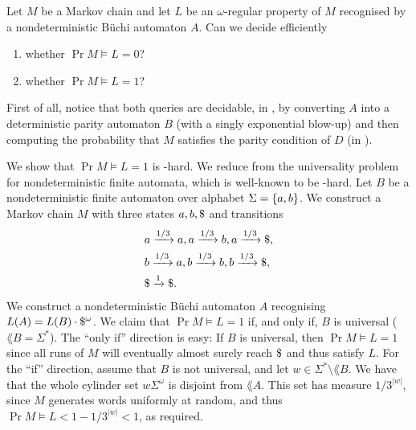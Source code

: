 \begin{exercise}
    Let $M$ be a Markov chain
    and let $L$ be an $\omega$-regular property of $M$ recognised by a nondeterministic Büchi automaton $A$.
    Can we decide efficiently
    \begin{enumerate}
        \item whether $\Pr {M \models L} = 0$?
        \item whether $\Pr {M \models L} = 1$?
    \end{enumerate} 
\end{exercise}
\begin{solution}
    First of all, notice that both queries are decidable, in \PSPACE,
    by converting $A$ into a deterministic parity automaton $B$ (with a singly exponential blow-up)
    and then computing the probability that $M$ satisfies the parity condition of $D$ (in ).

    We show that $\Pr {M \models L} = 1$ is \PSPACE-hard.
    We reduce from the universality problem for nondeterministic finite automata, which is well-known to be \PSPACE-hard.
    Let $B$ be a nondeterministic finite automaton over alphabet $\Sigma = \left\{a, b\right\}$.
    We construct a Markov chain $M$ with three states $a, b, \dollar$ and transitions
    \begin{align*}
        &a \xrightarrow{1/3} a, a \xrightarrow{1/3} b, a \xrightarrow{1/3} \$, \\
        &b \xrightarrow{1/3} a, b \xrightarrow{1/3} b, b \xrightarrow{1/3} \$, \\
        &\$ \xrightarrow{1} \$.
    \end{align*}
    We construct a nondeterministic Büchi automaton $A$
    recognising {$L(A) = L(B) \cdot \$^\omega$}.
    We claim that $\Pr {M \models L} = 1$ if, and only if, $B$ is universal ($\lang B = \Sigma^*$).
    The ``only if'' direction is easy: If $B$ is universal, then $\Pr {M \models L} = 1$
    since all runs of $M$ will eventually almost surely reach $\dollar$ and thus satisfy $L$.
    For the ``if'' direction, assume that $B$ is not universal, and let $w \in \Sigma^* \setminus \lang B$.
    We have that the whole cylinder set $w \Sigma^\omega$ is disjoint from $\lang A$.
    This set has measure $1/3^{|w|}$, since $M$ generates words uniformly at random,
    and thus $\Pr {M \models L} < 1 - 1/3^{|w|} < 1$, as required.
\end{solution}

